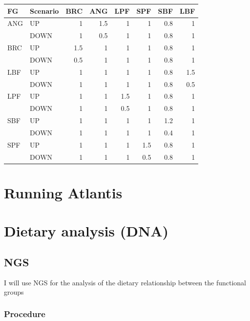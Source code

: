 \documentclass[11pt]{article}
\begin{document}
\begin{center}
\begin{tabular}{llrrrrrr}
 FG   &  Scenario  &  BRC  &  ANG  &  LPF  &  SPF  &  SBF  &  LBF  \\
\hline
 ANG  &  UP        &    1  &  1.5  &    1  &    1  &  0.8  &    1  \\
      &  DOWN      &    1  &  0.5  &    1  &    1  &  0.8  &    1  \\
\hline
 BRC  &  UP        &  1.5  &    1  &    1  &    1  &  0.8  &    1  \\
      &  DOWN      &  0.5  &    1  &    1  &    1  &  0.8  &    1  \\
\hline
 LBF  &  UP        &    1  &    1  &    1  &    1  &  0.8  &  1.5  \\
      &  DOWN      &    1  &    1  &    1  &    1  &  0.8  &  0.5  \\
\hline
 LPF  &  UP        &    1  &    1  &  1.5  &    1  &  0.8  &    1  \\
      &  DOWN      &    1  &    1  &  0.5  &    1  &  0.8  &    1  \\
\hline
 SBF  &  UP        &    1  &    1  &    1  &    1  &  1.2  &    1  \\
      &  DOWN      &    1  &    1  &    1  &    1  &  0.4  &    1  \\
\hline
 SPF  &  UP        &    1  &    1  &    1  &  1.5  &  0.8  &    1  \\
      &  DOWN      &    1  &    1  &    1  &  0.5  &  0.8  &    1  \\
\end{tabular}
\end{center}
\section*{Running Atlantis}
\label{sec-6}
\section*{Dietary analysis (DNA)}
\label{sec-7}
\subsection*{NGS}
\label{sec-7-1}

      I will use NGS for the analysis of the dietary relationship between the functional groups
\subsubsection*{Procedure}
\label{sec-7-1-1}
\end{document}
